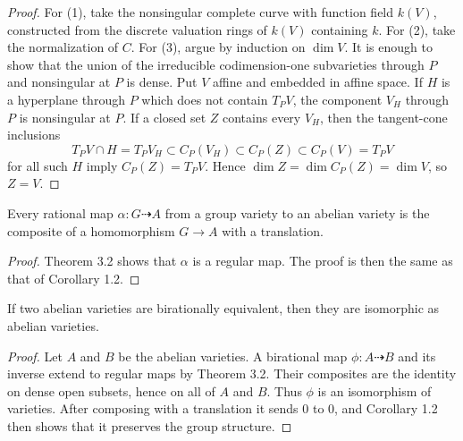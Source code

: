 \begin{proof}
For (1), take the nonsingular complete curve with function field $k(V)$,
constructed from the discrete valuation rings of $k(V)$ containing $k$.  For
(2), take the normalization of $C$.  For (3), argue by induction on
$\dim V$.  It is enough to show that the union of the irreducible
codimension-one subvarieties through $P$ and nonsingular at $P$ is dense.  Put
$V$ affine and embedded in affine space.  If $H$ is a hyperplane through $P$
which does not contain $T_PV$, the component $V_H$ through $P$ is nonsingular
at $P$.  If a closed set $Z$ contains every $V_H$, then the tangent-cone
inclusions
\[
 T_PV\cap H=T_PV_H\subset C_P(V_H)\subset C_P(Z)\subset C_P(V)=T_PV
\]
for all such $H$ imply $C_P(Z)=T_PV$.  Hence
$\dim Z=\dim C_P(Z)=\dim V$, so $Z=V$.
\end{proof}

\begin{corollary}
\label{cor:milne-group-to-abelian}

Every rational map $\alpha:G\dashrightarrow A$ from a group variety to an
abelian variety is the composite of a homomorphism $G\to A$ with a translation.
\end{corollary}

\begin{proof}
Theorem 3.2 shows that $\alpha$ is a regular map.  The proof is then the same
as that of Corollary 1.2.
\end{proof}

\begin{theorem}
\label{thm:milne-birational-abelian-isomorphism}

If two abelian varieties are birationally equivalent, then they are isomorphic
as abelian varieties.
\end{theorem}

\begin{proof}
Let $A$ and $B$ be the abelian varieties.  A birational map
$\phi:A\dashrightarrow B$ and its inverse extend to regular maps by Theorem
3.2.  Their composites are the identity on dense open subsets, hence on all
of $A$ and $B$.  Thus $\phi$ is an isomorphism of varieties.  After composing
with a translation it sends $0$ to $0$, and Corollary 1.2 then shows that it
preserves the group structure.
\end{proof}

